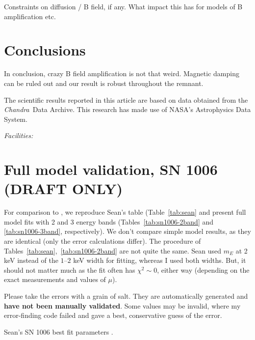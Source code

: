 \documentclass[12pt,preprint]{aastex}  %
\newcommand*{\Chandra}{\textit{Chandra}\ }
\begin{document}
Constraints on diffusion / B field, if any.  What impact this has for models of
B amplification etc.


\section{Conclusions}

In conclusion, crazy B field amplification is not that weird.
Magnetic damping can be ruled out and our result is robust throughout the remnant.

\acknowledgments

The scientific results reported in this article are based on data obtained from
the \Chandra Data Archive.
This research has made use of NASA's Astrophysics Data System.

{\it Facilities:} 

\clearpage

\appendix

\setcounter{table}{0}
\renewcommand{\thetable}{A\arabic{table}}
\setcounter{figure}{0}
\renewcommand{\thefigure}{A\arabic{figure}}

\section{Full model validation, SN 1006 (DRAFT ONLY)}

For comparison to , we reproduce Sean's table
(Table~\ref{tab:sean} and present full model fits with 2 and 3 energy bands
(Tables~\ref{tab:sn1006-2band} and \ref{tab:sn1006-3band}, respectively).
We don't compare simple model results, as they are identical (only the error
calculations differ).
The procedure of Tables~\ref{tab:sean},~\ref{tab:sn1006-2band} are not quite
the same.  Sean used $m_E$ at 2 keV instead of the $1$--$2$ keV width for
fitting, whereas I used both widths.  But, it should not matter much as
the fit often has $\chi^2 \sim 0$, either way (depending on the exact
measurements and values of $\mu$).

Please take the errors with a grain of salt.  They are automatically
generated and \textbf{have not been manually validated}.  Some values may be
invalid, where my error-finding code failed and gave a best, conservative guess
of the error.

\begin{table}[h]
\scriptsize
\centering
\caption{Sean's SN 1006 best fit parameters .
\label{tab:sean}}

\end{table}
\end{document}
